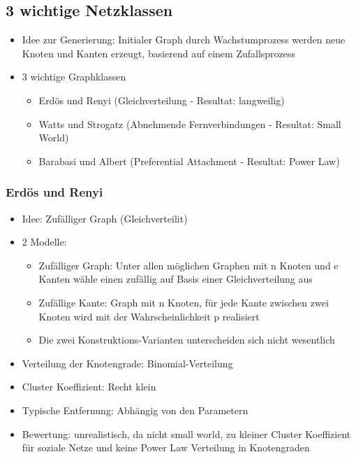 \documentclass{article} %
\begin{document}
	\subsection{3 wichtige Netzklassen}
	\begin{itemize}
		\item Idee zur Generierung: Initialer Graph durch Wachstumprozess werden neue Knoten und Kanten erzeugt, basierend auf einem Zufallsprozess
		\item 3 wichtige Graphklassen
		\begin{itemize}
			\item Erdös und Renyi (Gleichverteilung - Resultat: \glqq langweilig\grqq)
			\item Watts und Strogatz (Abnehmende Fernverbindungen - Resultat: Small World)
			\item Barabasi und Albert (Preferential Attachment - Resultat: Power Law)
		\end{itemize}
	\end{itemize}
	\subsubsection{Erdös und Renyi}
	\begin{itemize}
		\item Idee: Zufälliger Graph (Gleichverteilit)
		\item 2 Modelle:
		\begin{itemize}
			\item Zufälliger Graph: Unter allen möglichen Graphen mit n Knoten und e Kanten wähle einen zufällig auf Basis einer Gleichverteilung aus
			\item Zufällige Kante: Graph mit n Knoten, für jede Kante zwischen zwei Knoten wird mit der Wahrscheinlichkeit p realisiert
			\item Die zwei Konstruktions-Varianten unterscheiden sich \glqq nicht wesentlich\grqq
		\end{itemize}
		\item Verteilung der Knotengrade: Binomial-Verteilung
		\item Cluster Koeffizient: Recht klein
		\item Typische Entfernung: Abhängig von den Parametern
		\item Bewertung: unrealistisch, da nicht small world, zu kleiner Cluster Koeffizient für soziale Netze und keine Power Law Verteilung in Knotengraden
	\end{itemize}
	
\end{document}

